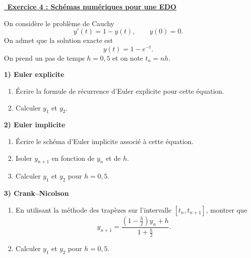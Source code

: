 \vspace{1em}

\underline{\, \bf{Exercice 4 : Schémas numériques pour une EDO}}
\medskip

On considère le problème de Cauchy
\[
y'(t)=1-y(t),\qquad y(0)=0.
\]
On admet que la solution exacte est
\[
y(t)=1-e^{-t}.
\]
On prend un pas de temps $h=0{,}5$ et on note $t_n=nh$.

\medskip

\textbf{1) Euler explicite}
\begin{enumerate}
    \item Écrire la formule de récurrence d'Euler explicite pour cette équation.
    \item Calculer $y_1$ et $y_2$.
\end{enumerate}

\medskip

\textbf{2) Euler implicite}
\begin{enumerate}
    \item Écrire le schéma d'Euler implicite associé à cette équation.
    \item Isoler $y_{n+1}$ en fonction de $y_n$ et de $h$.
    \item Calculer $y_1$ et $y_2$ pour $h=0{,}5$.
\end{enumerate}

\medskip

\textbf{3) Crank--Nicolson}
\begin{enumerate}
    \item En utilisant la méthode des trapèzes sur l'intervalle $[t_n,t_{n+1}]$, montrer que
    \[
    y_{n+1}
    =
    \frac{\left(1-\frac h2\right)y_n+h}{1+\frac h2}.
    \]
    \item Calculer $y_1$ et $y_2$ pour $h=0{,}5$.
\end{enumerate}

